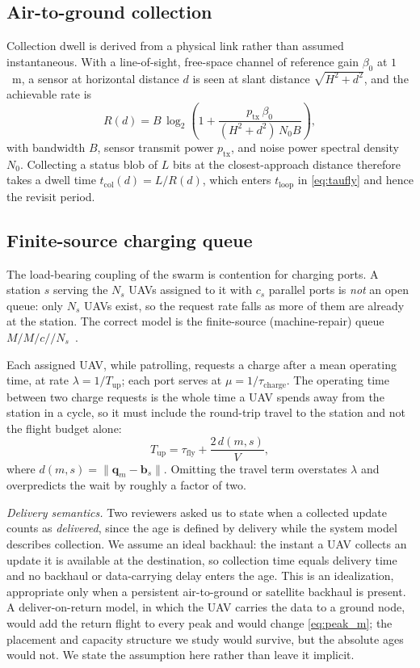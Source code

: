 \subsection{Air-to-ground collection}
\label{subsec:comms}
Collection dwell is derived from a physical link rather than assumed
instantaneous. With a line-of-sight, free-space channel of reference gain
$\beta_0$ at $1$~m, a sensor at horizontal distance $d$ is seen at slant distance
$\sqrt{H^2+d^2}$, and the achievable rate is
\begin{equation}
  R(d) = B\,\log_2\!\left(1+\frac{p_{\mathrm{tx}}\,\beta_0}
       {(H^2+d^2)\,N_0 B}\right),
  \label{eq:rate}
\end{equation}
with bandwidth $B$, sensor transmit power $p_{\mathrm{tx}}$, and noise power
spectral density $N_0$. Collecting a status blob of $L$ bits at the
closest-approach distance therefore takes a dwell time
$t_{\mathrm{col}}(d)=L/R(d)$, which enters $t_{\mathrm{loop}}$ in
\eqref{eq:taufly} and hence the revisit period.

\subsection{Finite-source charging queue}
\label{subsec:queue}
The load-bearing coupling of the swarm is contention for charging ports. A
station $s$ serving the $N_s$ UAVs assigned to it with $c_s$ parallel ports is
\emph{not} an open queue: only $N_s$ UAVs exist, so the request rate falls as
more of them are already at the station. The correct model is the finite-source
(machine-repair) queue $M/M/c//N_s$~\cite{grossharris}.

Each assigned UAV, while patrolling, requests a charge after a mean operating
time, at rate $\lambda=1/T_{\mathrm{up}}$; each port serves at
$\mu=1/\tau_{\mathrm{charge}}$. The operating time between two charge requests is
the whole time a UAV spends away from the station in a cycle, so it must include
the round-trip travel to the station and not the flight budget alone:
\begin{equation}
  T_{\mathrm{up}} = \tau_{\mathrm{fly}} + \frac{2\,d(m,s)}{V},
  \label{eq:uptime}
\end{equation}
where $d(m,s)=\|\mathbf{q}_m-\mathbf{b}_s\|$. Omitting the travel term overstates $\lambda$ and overpredicts the wait by roughly a
factor of two.

\emph{Delivery semantics.} Two reviewers asked us to state when a collected update
counts as \emph{delivered}, since the age is defined by delivery while the system model
describes collection. We assume an ideal backhaul: the instant a UAV collects an update
it is available at the destination, so collection time equals delivery time and no
backhaul or data-carrying delay enters the age. This is an idealization, appropriate
only when a persistent air-to-ground or satellite backhaul is present. A
deliver-on-return model, in which the UAV carries the data to a ground node, would add
the return flight to every peak and would change \eqref{eq:peak_m}; the placement and
capacity structure we study would survive, but the absolute ages would not. We state
the assumption here rather than leave it implicit.

